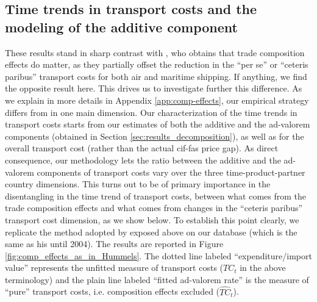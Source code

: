\documentclass[a4paper,11pt]{article}
\begin{document}
\subsection{Time trends in transport costs and the modeling of the additive component}

These results stand in sharp contrast with \citet{hummels2007}, who obtains that trade composition effects do matter, as they partially offset the reduction in the ``per se'' or ``ceteris paribus'' transport costs for both air and maritime shipping. If anything, we find the opposite result here. This drives us to investigate further this difference. As we explain in more details in Appendix \ref{app:comp-effects}, our empirical strategy differs from \cite{hummels2007} in one main dimension. Our characterization of the time trends in transport costs starts from our estimates of both the additive and the ad-valorem components (obtained in Section \ref{sec:results_decomposition}), as well as for the overall transport cost (rather than the actual cif-fas price gap). As direct consequence, our methodology lets the ratio between the additive and the ad-valorem components of transport costs vary over the three time-product-partner country dimensions. %
This turns out to be of primary importance in the disentangling in the time trend of transport costs, between what comes from the trade composition effects and what comes from changes in the ``ceteris paribus'' transport cost dimension, as we show below. To establish this point clearly, we replicate the method adopted by \cite{hummels2007} exposed above on our database (which is the same as his until 2004). The results are reported in Figure \ref{fig:comp_effects_as_in_Hummels}. The dotted line labeled ``expenditure/import value'' represents the unfitted measure of transport costs ($TC_t$ in the above terminology) and the plain line labeled ``fitted ad-valorem rate'' is the measure of ``pure'' transport costs, i.e. composition effects excluded ($\widehat{TC}_t$).
\end{document}
